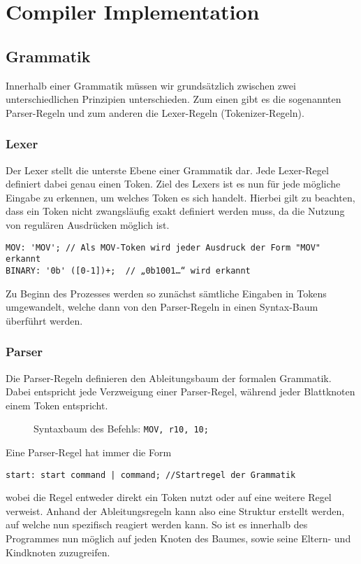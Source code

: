 \documentclass[paper=a4,fontsize=12pt,twocolumn]{scrreprt}
\begin{document}
\section{Compiler Implementation}

\subsection{Grammatik}
Innerhalb einer Grammatik müssen wir grundsätzlich zwischen zwei unterschiedlichen Prinzipien unterschieden.
Zum einen gibt es die sogenannten Parser-Regeln und zum anderen die Lexer-Regeln (Tokenizer-Regeln).

\subsubsection{Lexer}
Der Lexer stellt die unterste Ebene einer Grammatik dar.
Jede Lexer-Regel definiert dabei genau einen Token.
Ziel des Lexers ist es nun für jede mögliche Eingabe zu erkennen, um welches Token es sich handelt.
Hierbei gilt zu beachten, dass ein Token nicht zwangsläufig exakt definiert werden muss, da die Nutzung von regulären Ausdrücken möglich ist.
\begin{lstlisting}
MOV: 'MOV'; // Als MOV-Token wird jeder Ausdruck der Form "MOV" erkannt
BINARY: '0b' ([0-1])+;  // „0b1001…“ wird erkannt
\end{lstlisting}
Zu Beginn des Prozesses werden so zunächst sämtliche Eingaben in Tokens umgewandelt, welche dann von den Parser-Regeln in einen Syntax-Baum überführt werden.

\subsubsection{Parser}
Die Parser-Regeln definieren den Ableitungsbaum der formalen Grammatik.
Dabei entspricht jede Verzweigung einer Parser-Regel, während jeder Blattknoten einem Token entspricht.

\begin{figure}[h]
\centering
\caption{Syntaxbaum des Befehls: \texttt{MOV, r10, 10;}}
\end{figure}

Eine Parser-Regel hat immer die Form
\begin{lstlisting}
start: start command | command; //Startregel der Grammatik
\end{lstlisting}
wobei die Regel entweder direkt ein Token nutzt oder auf eine weitere Regel verweist.
Anhand der Ableitungsregeln kann also eine Struktur erstellt werden, auf welche nun spezifisch reagiert werden kann.
So ist es innerhalb des Programmes nun möglich auf jeden Knoten des Baumes, sowie seine Eltern- und Kindknoten zuzugreifen.
\end{document}
